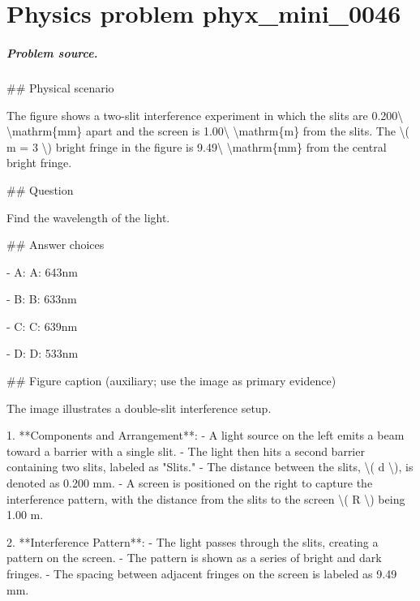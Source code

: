 
\chapter{Physics problem phyx\_mini\_0046}
\label{ch:PhyXMiniProblems_problem_phyx_mini_0046}

\paragraph{Problem source.}
\#\# Physical scenario

The figure shows a two-slit interference experiment in which the slits are 0.200\textbackslash{} \textbackslash{}mathrm\{mm\} apart and the screen is 1.00\textbackslash{} \textbackslash{}mathrm\{m\} from the slits. The \textbackslash{}( m = 3 \textbackslash{}) bright fringe in the figure is 9.49\textbackslash{} \textbackslash{}mathrm\{mm\} from the central bright fringe.

\#\# Question

Find the wavelength of the light.

\#\# Answer choices

- A: A: 643nm

- B: B: 633nm

- C: C: 639nm

- D: D: 533nm

\#\# Figure caption (auxiliary; use the image as primary evidence)

The image illustrates a double-slit interference setup.

1. **Components and Arrangement**:
   - A light source on the left emits a beam toward a barrier with a single slit.
   - The light then hits a second barrier containing two slits, labeled as "Slits."
   - The distance between the slits, \textbackslash{}( d \textbackslash{}), is denoted as 0.200 mm.
   - A screen is positioned on the right to capture the interference pattern, with the distance from the slits to the screen \textbackslash{}( R \textbackslash{}) being 1.00 m.

2. **Interference Pattern**:
   - The light passes through the slits, creating a pattern on the screen.
   - The pattern is shown as a series of bright and dark fringes.
   - The spacing between adjacent fringes on the screen is labeled as 9.49 mm.


